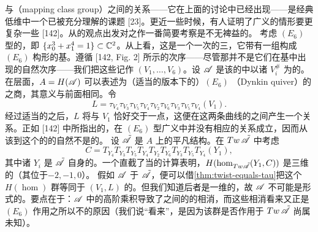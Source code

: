 \begin{remark}\label{thm:braid-mapping-classical}
\trBraidGroup{}与\textbf{\trMappingClassGroup}（mapping class group）之间的关系——它在上面的讨论中已经出现——是经典低维\trTopology{}中一个已被充分理解的课题 [23]。更近一些时候，有人证明了广义\trBraidGroup{}的情形要更复杂一些 [142]。从\trFukayaCategory{}的观点出发对之作一番简要考察是不无裨益的。
考虑 $(E_6)$ 型\trSingularPoint{}的\trMilnorFibre，即 $\{x_0^3+x_1^4=1\}\subset\mathbb{C}^2$。从\trTopology{}上看，这是一个\trPunctured{}一次的\trGenus{}三\trSurface，它带有一组构成 $(E_6)$ 构形的\trVanishingCycle{}基。遵循 [142, Fig. 2] 所示的次序——尽管那并不是它们在基中出现的自然次序——我们把这些\trCycle{}记作 $(V_1,\ldots,V_6)$。设 $\mathscr{A}$ 是该\trMilnorFibre{}的\trFukayaCategory{}中以诸 $V_i^\#$ 为\trObject{}的\trFullSubcategory。在\trCohomology{}层面，$A=H(\mathscr{A})$ 可以表述为（适当\trGraded{}的版本下的）$(E_6)$ \textbf{\trDynkin{}\trQuiver}（Dynkin quiver）的\trPathAlgebra{}之商，其意义与前面相同。令
\begin{equation*}
L=\tau_{V_4}\tau_{V_3}\tau_{V_5}\tau_{V_4}\tau_{V_2}\tau_{V_6}\tau_{V_3}\tau_{V_5}\tau_{V_4}(V_1).
\end{equation*}
经过适当的\trIsotopy{}之后，$L$ 将与 $V_1$ 恰好交于一点，这便在这两条曲线的\trDehnTwist{}之间产生一个\trBraid{}关系。正如 [142] 中所指出的，在 $(E_6)$ 型广义\trBraidGroup{}中并没有相应的关系成立，因而从该\trBraidGroup{}到这个\trMilnorFibre{}的\trMappingClassGroup{}的自然\trHomomorphism{}不是\trInjective{}的。
设 $\tilde{\mathscr{A}}$ 是 $A$ 上的平凡\trAinfty{}结构。在 $Tw\,\tilde{\mathscr{A}}$ 中考虑\trTwistedComplex
\begin{equation*}
C=T_{Y_4}T_{Y_3}T_{Y_5}T_{Y_4}T_{Y_2}T_{Y_6}T_{Y_3}T_{Y_5}T_{Y_4}(Y_1),
\end{equation*}
其中诸 $Y_i$ 是 $\tilde{\mathscr{A}}$ 自身的\trObject。一个直截了当的计算表明，$H(\hom_{Tw\tilde{\mathscr{A}}}(Y_1,C))$ 是三维的（其\trGenerator{}位于\trDegree{}$-2,-1,0$）。
假如 $\mathscr{A}$ \trQuasiisomorphic{}于 $\tilde{\mathscr{A}}$，便可以借\cref{thm:twist-equals-tau}把这个 $H(\hom)$ 群等同于 $(V_1,L)$ 的\trFloerCohomology。但我们知道后者是一维的，故 $\mathscr{A}$ 不可能是形式的。要点在于：$\mathscr{A}$ 中的高阶乘积导致了\trTwistedComplex{}之间的\trHomomorphism{}的相消，而这些相消看来又正是 $(E_6)$ \trBraidGroup{}作用之所以不\trFaithful{}的原因（我们说“看来”，是因为该群是否\trFaithful{}作用于 $Tw\,\tilde{\mathscr{A}}$ 尚属未知）。
\end{remark}
